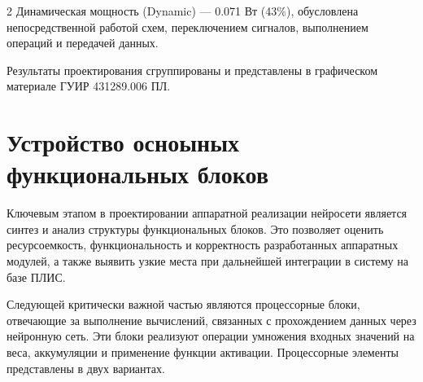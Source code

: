 2 Динамическая мощность (Dynamic) — 0.071 Вт (43\%), обусловлена 
непосредственной работой схем, переключением сигналов, выполнением операций и 
передачей данных.

Результаты проектирования сгруппированы и представлены в графическом материале 
ГУИР 431289.006 ПЛ.

\section{Устройство осноыных функциональных блоков}
\hspace*{12.5 mm}Ключевым этапом в проектировании аппаратной реализации 
нейросети является синтез и анализ структуры функциональных блоков. Это 
позволяет оценить ресурсоемкость, функциональность и корректность разработанных 
аппаратных модулей, а также выявить узкие места при дальнейшей интеграции в 
систему на базе ПЛИС.






Следующей критически важной частью являются процессорные блоки, отвечающие за 
выполнение вычислений, связанных с прохождением данных через нейронную сеть. 
Эти блоки реализуют операции умножения входных значений на веса, аккумуляции и 
применение функции активации.
Процессорные элементы представлены в двух вариантах.

